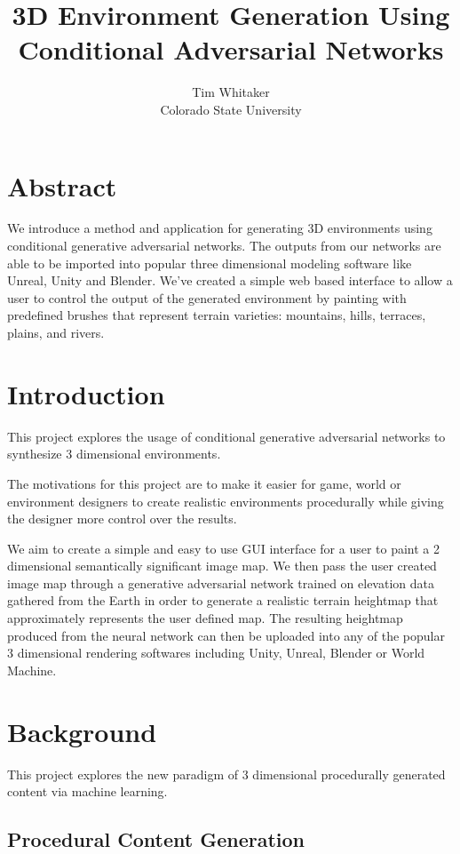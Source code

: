 \documentclass[twocolumn]{article}
\title{3D Environment Generation Using Conditional Adversarial Networks}
\author{Tim Whitaker \\ Colorado State University}
\begin{document}
	\maketitle
	
	\section{Abstract}
	
	We introduce a method and application for generating 3D environments using conditional generative adversarial networks. The outputs from our networks are able to be imported into popular three dimensional modeling software like Unreal, Unity and Blender. We've created a simple web based interface to allow a user to control the output of the generated environment by painting with predefined brushes that represent terrain varieties: mountains, hills, terraces, plains, and rivers.
	
	\section{Introduction}

	This project explores the usage of conditional generative adversarial networks to synthesize 3 dimensional environments.
	
	The motivations for this project are to make it easier for game, world or environment designers to create realistic environments procedurally while giving the designer more control over the results.
	
	We aim to create a simple and easy to use GUI interface for a user to paint a 2 dimensional semantically significant image map. We then pass the user created image map through a generative adversarial network trained on elevation data gathered from the Earth in order to generate a realistic terrain heightmap that approximately represents the user defined map. The resulting heightmap produced from the neural network can then be uploaded into any of the popular 3 dimensional rendering softwares including Unity, Unreal, Blender or World Machine.
	
	\section{Background}
	
	This project explores the new paradigm of 3 dimensional procedurally generated content via machine learning.
		
	\subsection{Procedural Content Generation}
	
\end{document}
